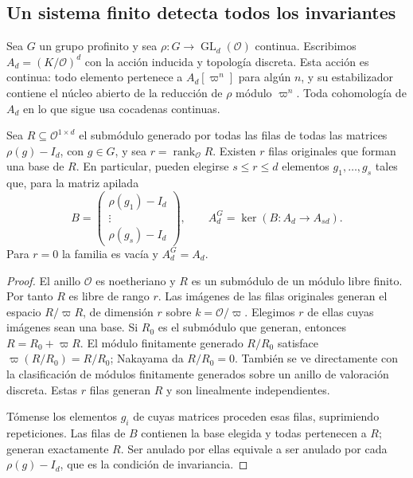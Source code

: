 \subsection{Un sistema finito detecta todos los invariantes}
\label{subsec:lu-detectores}

Sea $G$ un grupo profinito y sea
$\rho:G\to\operatorname{GL}_d(\mathcal O)$ continua. Escribimos
$A_d=(K/\mathcal O)^d$ con la acción inducida y topología discreta.
Esta acción es continua: todo elemento pertenece a
$A_d[\varpi^n]$ para algún $n$, y su estabilizador contiene el
núcleo abierto de la reducción de $\rho$ módulo $\varpi^n$.
Toda cohomología de $A_d$ en lo que sigue usa cocadenas continuas.

\begin{lema}
\label{lem:lu-detectores}
Sea $R\subseteq\mathcal O^{1\times d}$ el submódulo generado por
todas las filas de todas las matrices $\rho(g)-I_d$, con $g\in G$,
y sea $r=\operatorname{rank}_{\mathcal O}R$. Existen $r$ filas
originales que forman una base de $R$. En particular, pueden
elegirse $s\le r\le d$ elementos $g_1,\ldots,g_s$ tales que,
para la matriz apilada
\begin{equation}
 B=\begin{pmatrix}\rho(g_1)-I_d\\ \vdots\\\rho(g_s)-I_d\end{pmatrix},
 \qquad A_d^G=\ker(B:A_d\to A_{sd}).
 \label{eq:lu-detector}
\end{equation}
Para $r=0$ la familia es vacía y $A_d^G=A_d$.
\end{lema}
\begin{proof}
El anillo $\mathcal O$ es noetheriano y $R$ es un submódulo de
un módulo libre finito. Por tanto $R$ es libre de rango $r$.
Las imágenes de las filas originales generan el espacio
$R/\varpi R$, de dimensión $r$ sobre $k=\mathcal O/\varpi$.
Elegimos $r$ de ellas cuyas imágenes sean una base. Si $R_0$
es el submódulo que generan, entonces
$R=R_0+\varpi R$. El módulo finitamente generado $R/R_0$
satisface $\varpi(R/R_0)=R/R_0$; Nakayama da $R/R_0=0$.
También se ve directamente con la clasificación de módulos
finitamente generados sobre un anillo de valoración discreta.
Estas $r$ filas generan $R$ y son linealmente independientes.

Tómense los elementos $g_i$ de cuyas matrices proceden esas
filas, suprimiendo repeticiones. Las filas de $B$ contienen la
base elegida y todas pertenecen a $R$; generan exactamente $R$.
Ser anulado por ellas equivale a ser anulado por cada
$\rho(g)-I_d$, que es la condición de invariancia.
\end{proof}

